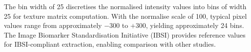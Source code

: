 \begin{appendices}
The bin width of 25 discretises the normalised intensity values into bins of width 25 for texture matrix computation. With the normalise scale of 100, typical pixel values range from approximately $-300$ to $+300$, yielding approximately 24 bins. The Image Biomarker Standardisation Initiative (IBSI) \cite{zwanenburg2020} provides reference values for IBSI-compliant extraction, enabling comparison with other studies.

\end{appendices}
\newpage
